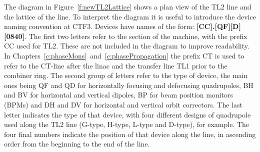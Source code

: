 

The diagram in Figure~\ref{f:newTL2Lattice} shows a plan view of the TL2 line and the lattice of the line. To interpret the diagram it is useful to introduce the device naming convention at CTF3. Devices have names of the form: \textbf{[CC].[QF][D][0840]}. The first two letters refer to the section of the machine, with the prefix CC used for TL2. These are not included in the diagram to improve readability. In Chapters~\ref{c:phaseMons}~and~\ref{c:phasePropagation} the prefix CT is used to refer to the CT-line after the linac and the transfer line TL1 prior to the combiner ring. The second group of letters refer to the type of device, the main ones being QF and QD for horizontally focusing and defocusing quadrupoles, BH and BV for horizontal and vertical dipoles, BP for beam position monitors (BPMs) and DH and DV for horizontal and vertical orbit correctors. The last letter indicates the type of that device, with four different designs of quadrupole used along the TL2 line (G-type, H-type, L-type and D-type), for example. The four final numbers indicate the position of that device along the line, in ascending order from the beginning to the end of the line.

